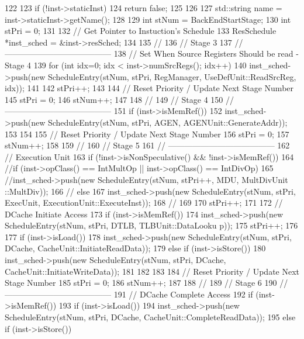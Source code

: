 \begin{DoxyCode}
122 {
123     if (!inst->staticInst) {
124         return false;
125     }
126 
127     std::string name = inst->staticInst->getName();
128 
129     int stNum = BackEndStartStage;
130     int stPri = 0;
131 
132     // Get Pointer to Instuction's Schedule
133     ResSchedule *inst_sched = &inst->resSched;
134 
135     //
136     // Stage 3
137     // ---------------------------------------
138     // Set When Source Registers Should be read - Stage 4
139     for (int idx=0; idx < inst->numSrcRegs(); idx++) {
140         inst_sched->push(new ScheduleEntry(stNum, stPri, RegManager, 
      UseDefUnit::ReadSrcReg, idx));
141     }
142     stPri++;
143 
144     // Reset Priority / Update Next Stage Number
145     stPri = 0;
146     stNum++;
147 
148     //
149     // Stage 4
150     // ---------------------------------------
151     if (inst->isMemRef()) {
152         inst_sched->push(new ScheduleEntry(stNum, stPri, AGEN, 
      AGENUnit::GenerateAddr));
153     }
154 
155     // Reset Priority / Update Next Stage Number
156     stPri = 0;
157     stNum++;
158 
159     //
160     // Stage 5
161     // ---------------------------------------
162     // Execution Unit
163     if (!inst->isNonSpeculative() && !inst->isMemRef()) {
164         //if (inst->opClass() == IntMultOp || inst->opClass() == IntDivOp) {
165             //inst_sched->push(new ScheduleEntry(stNum, stPri++, MDU, MultDivUnit
      ::MultDiv));
166             //} else {
167             inst_sched->push(new ScheduleEntry(stNum, stPri, ExecUnit, 
      ExecutionUnit::ExecuteInst));
168             //}
169     }
170     stPri++;
171 
172     // DCache Initiate Access
173     if (inst->isMemRef()) {
174         inst_sched->push(new ScheduleEntry(stNum, stPri, DTLB, TLBUnit::DataLooku
      p));
175         stPri++;
176 
177         if (inst->isLoad()) {
178             inst_sched->push(new ScheduleEntry(stNum, stPri, DCache, 
      CacheUnit::InitiateReadData));
179         } else if (inst->isStore()) {
180             inst_sched->push(new ScheduleEntry(stNum, stPri, DCache, 
      CacheUnit::InitiateWriteData));
181         }
182     }
183 
184     // Reset Priority / Update Next Stage Number
185     stPri = 0;
186     stNum++;
187 
188     //
189     // Stage 6
190     // ---------------------------------------
191     // DCache Complete Access
192     if (inst->isMemRef()) {
193         if (inst->isLoad()) {
194             inst_sched->push(new ScheduleEntry(stNum, stPri, DCache, 
      CacheUnit::CompleteReadData));
195         } else if (inst->isStore()) {
}}}
\end{DoxyCode}
